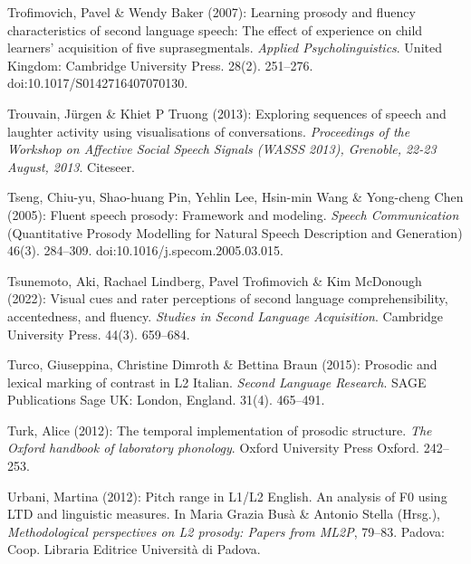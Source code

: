 \begin{styleBibliography}
Trofimovich, Pavel \& Wendy Baker (2007): Learning prosody and fluency characteristics of second language speech: The effect of experience on child learners’ acquisition of five suprasegmentals. \textit{Applied Psycholinguistics}. United Kingdom: Cambridge University Press. 28(2). 251–276. doi:10.1017/S0142716407070130.
\end{styleBibliography}

\begin{styleBibliography}
Trouvain, Jürgen \& Khiet P Truong (2013): Exploring sequences of speech and laughter activity using visualisations of conversations. \textit{Proceedings of the Workshop on Affective Social Speech Signals (WASSS 2013), Grenoble, 22-23 August, 2013}. Citeseer.
\end{styleBibliography}

\begin{styleBibliography}
Tseng, Chiu-yu, Shao-huang Pin, Yehlin Lee, Hsin-min Wang \& Yong-cheng Chen (2005): Fluent speech prosody: Framework and modeling. \textit{Speech Communication} (Quantitative Prosody Modelling for Natural Speech Description and Generation) 46(3). 284–309. doi:10.1016/j.specom.2005.03.015.
\end{styleBibliography}

\begin{styleBibliography}
Tsunemoto, Aki, Rachael Lindberg, Pavel Trofimovich \& Kim McDonough (2022): Visual cues and rater perceptions of second language comprehensibility, accentedness, and fluency. \textit{Studies in Second Language Acquisition}. Cambridge University Press. 44(3). 659–684.
\end{styleBibliography}

\begin{styleBibliography}
Turco, Giuseppina, Christine Dimroth \& Bettina Braun (2015): Prosodic and lexical marking of contrast in L2 Italian. \textit{Second Language Research}. SAGE Publications Sage UK: London, England. 31(4). 465–491.
\end{styleBibliography}

\begin{styleBibliography}
Turk, Alice (2012): The temporal implementation of prosodic structure. \textit{The Oxford handbook of laboratory phonology}. Oxford University Press Oxford. 242–253.
\end{styleBibliography}

\begin{styleBibliography}
Urbani, Martina (2012): Pitch range in L1/L2 English. An analysis of F0 using LTD and linguistic measures. In Maria Grazia Busà \& Antonio Stella (Hrsg.), \textit{Methodological perspectives on L2 prosody: Papers from ML2P}, 79–83. Padova: Coop. Libraria Editrice Università di Padova.
\end{styleBibliography}

